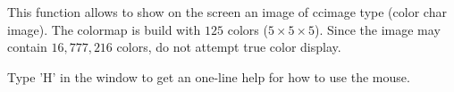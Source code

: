 This function allows to show on the screen an image of ccimage type
(color char image).
The colormap is build with $125$ colors ($5 \times 5 \times 5$).
Since the image may contain $16,777,216$ colors, do not attempt
true color display.

Type 'H' in the window to get an one-line help for how to use the mouse.

